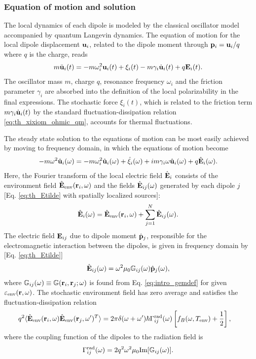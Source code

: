 \subsubsection{Equation of motion and solution}

The local dynamics of each dipole is modeled by the classical oscillator model accompanied by quantum Langevin dynamics. The equation of motion for the local dipole displacement $\mathbf{u}_i$, related to the dipole moment through $\mathbf{p}_i=\mathbf{u}_i/q$ where $q$ is the charge, reads
 \begin{equation}
 m\ddot{\mathbf{u}}_i(t) = -m\omega_i^2 \mathbf{u}_i(t) +\xi_i(t) -m\gamma_i \dot{\mathbf{u}}_i(t)  + q \mathbf{E}_i(t). \label{eq:gfm_eom1}
\end{equation}
The oscillator mass $m$, charge $q$, resonance frequency $\omega_i$ and the friction parameter $\gamma_i$ are absorbed into the definition of the local polarizability in the final expressions. The stochastic force $\xi_i(t)$, which is related to the friction term $m\gamma_i\dot{\mathbf{u}}_i(t)$ by the standard fluctuation-dissipation relation \eqref{eq:th_xixiom_ohmic_qm}, accounts for thermal fluctuations. 

The steady state solution to the equations of motion can be most easily achieved by moving to frequency domain, in which the equations of motion become
\begin{equation}
 -m\omega^2 \hat{\mathbf{u}}_i(\omega) = -m\omega_i^2 \hat{\mathbf{u}}_i(\omega) +\hat \xi_i(\omega) +im\gamma_i \omega \hat {\mathbf{u}}_i(\omega)  + q \hat {\mathbf{E}}_i(\omega). \label{eq:gfm_eom2}
\end{equation}
Here, the Fourier transform of the local electric field $\hat {\mathbf{E}}_i$ consists of the environment field $\hat{\mathbf{E}}_{\textrm{env}}(\mathbf{r}_i,\omega)$ and the fields $\hat {\mathbf{E}}_{ij}(\omega)$ generated by each dipole $j$ [Eq. \eqref{eq:th_Etilde} with spatially localized sources]:
\begin{equation}
 \hat{\mathbf{E}}_i(\omega)= \hat{\mathbf{E}}_{\textrm{env}}(\mathbf{r}_i,\omega) + \sum_{j=1}^N \hat{\mathbf{E}}_{ij}(\omega). \label{eq:gfm_etot}
\end{equation}
The electric field $\mathbf{E}_{ij}$ due to dipole moment $\hat{\mathbf{p}}_j$, responsible for the electromagnetic interaction between the dipoles, is given in frequency domain by [Eq. \eqref{eq:th_Etilde}]
\begin{equation}
 \hat{\mathbf{E}}_{ij}(\omega) = \omega^2 \mu_0\mathbb{G}_{ij}(\omega) \hat{\mathbf{p}}_j (\omega), \label{eq:gfm_ekl}
\end{equation}
where $\mathbb{G}_{ij}(\omega)\equiv \mathbb{G}(\mathbf{r}_i,\mathbf{r}_j;\omega)$ is found from Eq. \eqref{eq:intro_gemdef} for given $\varepsilon_{\textrm{env}}(\mathbf{r},\omega)$. The stochastic environment field has zero average and satisfies the fluctuation-dissipation relation \cite{novotny}
\begin{alignat}{2}
  q^2 \langle \hat{\mathbf{E}}_{\textrm{env}}(\mathbf{r}_i,\omega) \hat{\mathbf{E}}_{\textrm{env}}(\mathbf{r}_j,\omega')^T \rangle   &=  2\pi \delta(\omega+\omega') \hbar \Gamma^{\textrm{rad}}_{ij}(\omega) \left[f_B(\omega,T_{\textrm{env}})+\frac{1}{2} \right], \label{eq:gfm_ebgebg1}
\end{alignat}
where the coupling function of the dipoles to the radiation field is
\begin{equation}
 \Gamma_{ij}^{\textrm{rad}}(\omega) = 2 q^2\omega^2\mu_0 \textrm{Im}[\mathbb{G}_{ij}(\omega)]. \label{eq:gfm_gammarad_def}
\end{equation}

